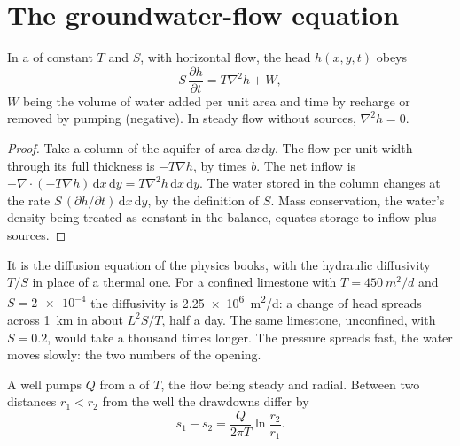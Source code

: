 \section{The groundwater-flow equation}\label{sec:b3:hydrogeology:flow-equation}

\begin{theorem}\label{thm:b3:hydrogeology:flow-equation}
In a  of constant  $T$ and  $S$,
with horizontal flow, the head $h(x, y, t)$ obeys
\[
S\,\frac{\partial h}{\partial t} = T\nabla^2h + W ,
\]
$W$ being the volume of water added per unit area and time by recharge or
removed by pumping (negative). In steady flow without sources, $\nabla^2h =
0$.
\end{theorem}

\begin{proof}
Take a column of the aquifer of area $\mathrm dx\,\mathrm dy$. The flow per
unit width through its full thickness is $-T\nabla h$, by 
times $b$. The net inflow is $-\nabla\cdot(-T\nabla h)\,\mathrm dx\,\mathrm
dy = T\nabla^2h\,\mathrm dx\,\mathrm dy$. The water stored in the column
changes at the rate $S\,(\partial h/\partial t)\,\mathrm dx\,\mathrm dy$,
by the definition of $S$. Mass conservation, the water's density being
treated as constant in the balance, equates storage to inflow plus sources.
\end{proof}

It is the diffusion equation of the physics books, with the hydraulic
diffusivity $T/S$ in place of a thermal one. For a confined limestone with
$T = \qty{450}{m^2/d}$ and $S = \num{2e-4}$ the diffusivity is
\qty{2.25e6}{m^2/d}: a change of head spreads across \qty{1}{km} in
about $L^2S/T$, half a day. The same limestone, unconfined, with $S =
0.2$, would take a thousand times longer. The pressure spreads fast, the
water moves slowly: the two numbers of the opening.

\begin{proposition}\label{prop:b3:hydrogeology:thiem}
A well pumps $Q$ from a  of  $T$, the flow
being steady and radial. Between two distances $r_1 < r_2$ from the well the
drawdowns differ by
\[
s_1 - s_2 = \frac{Q}{2\pi T}\ln\frac{r_2}{r_1} .
\]
\end{proposition}

